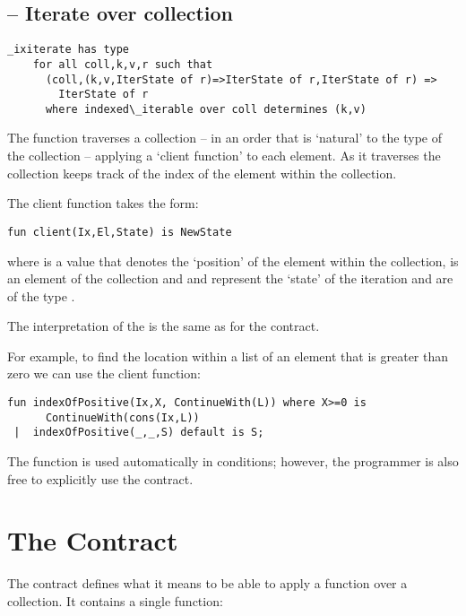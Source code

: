 \subsection{ -- Iterate over collection}
\label{indexIterateFunction}
\begin{lstlisting}
_ixiterate has type 
    for all coll,k,v,r such that 
      (coll,(k,v,IterState of r)=>IterState of r,IterState of r) => 
        IterState of r
      where indexed\_iterable over coll determines (k,v)
\end{lstlisting}

The  function traverses a collection -- in an order that is `natural' to the type of the collection -- applying a `client function' to each element. As it traverses the collection  keeps track of the index of the element within the collection.

The client function takes the form:
\begin{lstlisting}
fun client(Ix,El,State) is NewState
\end{lstlisting}
where  is a value that denotes the `position' of the element within the collection,  is an element of the collection and  and  represent the `state' of the iteration and are of the type .

The interpretation of the  is the same as for the  contract.

For example, to find the location within a  list of an element that is greater than zero we can use the client function:
\begin{lstlisting}
fun indexOfPositive(Ix,X, ContinueWith(L)) where X>=0 is
      ContinueWith(cons(Ix,L))
 |  indexOfPositive(_,_,S) default is S;
\end{lstlisting}
\begin{aside}
The  function is used automatically in  conditions; however, the programmer is also free to explicitly use the  contract.
\end{aside}

\section{The  Contract}
\label{mappableContract}
The  contract defines what it means to be able to apply a function over a collection. It contains a single  function:

